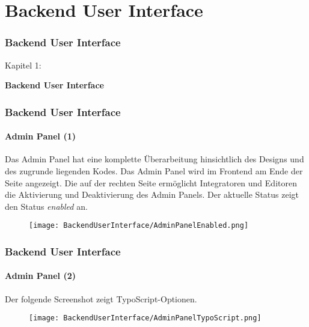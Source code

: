 %

\section{Backend User Interface}
\begin{frame}[fragile]
	\frametitle{Backend User Interface}

	\begin{center}\huge{Kapitel 1:}\end{center}
	\begin{center}\huge{\color{typo3darkgrey}\textbf{Backend User Interface}}\end{center}

\end{frame}


\begin{frame}[fragile]
	\frametitle{Backend User Interface}
	\framesubtitle{Admin Panel (1)}

    Das Admin Panel hat eine komplette Überarbeitung hinsichtlich des Designs und des zugrunde liegenden
    Kodes.
	\newline\newline
	Das Admin Panel wird im Frontend am Ende der Seite angezeigt.
	Die auf der rechten Seite ermöglicht Integratoren und Editoren die Aktivierung 
	und Deaktivierung des Admin Panels. Der aktuelle Status zeigt den Status \textit{enabled} an.

	\begin{figure}
		\texttt{[image: BackendUserInterface/AdminPanelEnabled.png]}
	\end{figure}

\end{frame}


\begin{frame}[fragile]
	\frametitle{Backend User Interface}
	\framesubtitle{Admin Panel (2)}

	Der folgende Screenshot zeigt TypoScript-Optionen.

	\begin{figure}
		\texttt{[image: BackendUserInterface/AdminPanelTypoScript.png]}
	\end{figure}

\end{frame}

